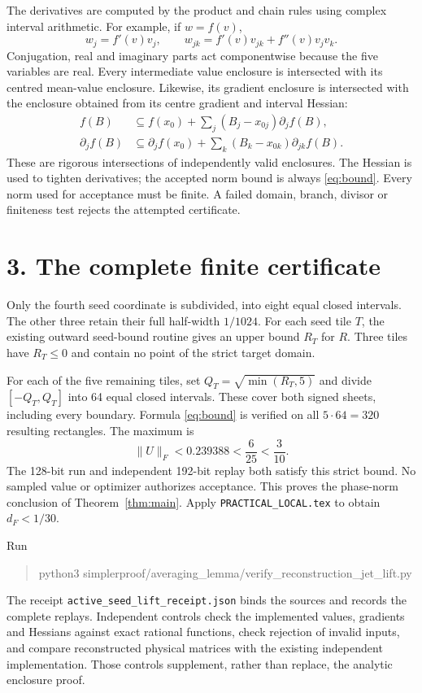 \documentclass[11pt]{article}
\begin{document}
The derivatives are computed by the product and chain rules using
complex interval arithmetic. For example, if $w=f(v)$,
\[
 w_j=f'(v)v_j,\qquad
 w_{jk}=f'(v)v_{jk}+f''(v)v_jv_k.
\]
Conjugation, real and imaginary parts act componentwise because the
five variables are real. Every intermediate value enclosure is
intersected with its centred mean-value enclosure. Likewise, its
gradient enclosure is intersected with the enclosure obtained from
its centre gradient and interval Hessian:
\begin{align*}
 f(B)&\subseteq f(x_0)+\sum_j(B_j-x_{0j})\partial_jf(B),\\
 \partial_jf(B)&\subseteq\partial_jf(x_0)
              +\sum_k(B_k-x_{0k})\partial_{jk}f(B).
\end{align*}
These are rigorous intersections of independently valid enclosures.
The Hessian is used to tighten derivatives; the accepted norm bound
is always \eqref{eq:bound}. Every norm used for acceptance must be
finite. A failed domain, branch, divisor or finiteness test rejects
the attempted certificate.

\section*{3. The complete finite certificate}
Only the fourth seed coordinate is subdivided, into eight equal
closed intervals. The other three retain their full half-width
$1/1024$. For each seed tile $T$, the existing outward seed-bound
routine gives an upper bound $R_T$ for $R$. Three tiles have
$R_T\le0$ and contain no point of the strict target domain.

For each of the five remaining tiles, set
$Q_T=\sqrt{\min(R_T,5)}$ and divide $[-Q_T,Q_T]$ into 64 equal
closed intervals. These cover both signed sheets, including every
boundary. Formula \eqref{eq:bound} is verified on all
$5\cdot64=320$ resulting rectangles. The maximum is
\[
 \|U\|_F<0.239388<\frac6{25}<\frac3{10}.
\]
The 128-bit run and independent 192-bit replay both satisfy this
strict bound. No sampled value or optimizer authorizes acceptance.
This proves the phase-norm conclusion of Theorem~\ref{thm:main}.
Apply \texttt{PRACTICAL\_LOCAL.tex} to obtain $d_F<1/30$.

Run
\begin{quote}\ttfamily\small
python3 simplerproof/averaging\_lemma/verify\_reconstruction\_jet\_lift.py
\end{quote}
The receipt \texttt{active\_seed\_lift\_receipt.json} binds the
sources and records the complete replays. Independent controls check
the implemented values, gradients and Hessians against exact rational
functions, check rejection of invalid inputs, and compare reconstructed
physical matrices with the existing independent implementation. Those
controls supplement, rather than replace, the analytic enclosure proof.
\end{document}
